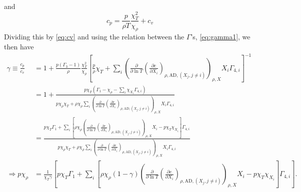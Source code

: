and 
\[
c_p = \frac{p}{\rho T}\frac{\chi_T^2}{\chi_\rho} + c_v
\]
Dividing this by \eqref{eq:cv} and using the relation between the 
$\Gamma$'s, \eqref{eq:gamma1}, we then have
\begin{align}\label{eq:pchirho}
  \gamma \equiv \frac{c_p}{c_v} &= 1 + \frac{p(\Gamma_3-1)}{\rho }
  \frac{\chi_T^2}{\chi_\rho}\left[\frac{p}{\rho}\chi_T +\sum_i
    \left(\frac{\partial}{\partial\ln T}\left(
    \frac{\partial e}{\partial X_i}\right)_{\rho,\text{AD},(X_j,j\neq i)}
    \right)_{\rho,X}X_i
    \Gamma_{4,i}\right]^{-1}{}\nonumber\\
  &= 1 + \frac{p\chi_T\left(\Gamma_1 - \chi_\rho -
    \sum_i \chi_{X_i}\Gamma_{4,i}\right)}{p\chi_\rho\chi_T + \rho
    \chi_\rho\sum_i \left(
    \frac{\partial}{\partial \ln T}\left(
    \frac{\partial e}{\partial X_i}\right)_{\rho,\text{AD},(X_j,j\neq i)}
    \right)_{\rho,X}X_i\Gamma_{4,i}}{}\nonumber\\
  &= \frac{p\chi_T\Gamma_1 + \sum_i \left[\rho\chi_\rho\left(
    \frac{\partial}{\partial \ln T}\left(\frac{\partial e}{\partial X_i}
    \right)_{\rho,\text{AD},(X_j,j\neq i)}\right)_{\rho,X}X_i - p\chi_T
    \chi_{X_i}\right]\Gamma_{4,i}}{p\chi_\rho\chi_T + \rho
    \chi_\rho\sum_i \left(
    \frac{\partial}{\partial \ln T}\left(
    \frac{\partial e}{\partial X_i}\right)_{\rho,\text{AD},(X_j,j\neq i)}
    \right)_{\rho,X}X_i\Gamma_{4,i}}{}\nonumber\\
  \Rightarrow p\chi_\rho &= \frac{1}{\chi_T\gamma}\left[p\chi_T\Gamma_1 + 
    \sum_i \left[\rho\chi_\rho\left(1-\gamma\right)\left(
      \frac{\partial}{\partial \ln T}\left(\frac{\partial e}{\partial X_i}
      \right)_{\rho,\text{AD},(X_j,j\neq i)}\right)_{\rho,X}X_i - p\chi_T
      \chi_{X_i}\right]\Gamma_{4,i}\right].
\end{align}

